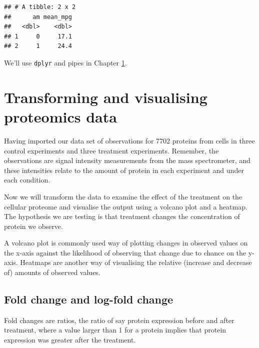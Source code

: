 \documentclass[12pt,]{book}
\newenvironment{Shaded}{\begin{snugshade}}{\end{snugshade}}
\newcommand{\KeywordTok}[1]{\textcolor[rgb]{0.13,0.29,0.53}{\textbf{#1}}}
\newcommand{\DataTypeTok}[1]{\textcolor[rgb]{0.13,0.29,0.53}{#1}}
\newcommand{\StringTok}[1]{\textcolor[rgb]{0.31,0.60,0.02}{#1}}
\newcommand{\CommentTok}[1]{\textcolor[rgb]{0.56,0.35,0.01}{\textit{#1}}}
\newcommand{\OperatorTok}[1]{\textcolor[rgb]{0.81,0.36,0.00}{\textbf{#1}}}
\newcommand{\NormalTok}[1]{#1}
\theoremstyle{definition}
\theoremstyle{definition}
\theoremstyle{definition}
\theoremstyle{remark}
\begin{document}
\begin{Shaded}
\end{Shaded}

\begin{verbatim}
## # A tibble: 2 x 2
##      am mean_mpg
##   <dbl>    <dbl>
## 1     0     17.1
## 2     1     24.4
\end{verbatim}

We'll use \texttt{dplyr} and pipes in Chapter \ref{transform}.

\chapter{Transforming and visualising proteomics data}\label{transform}

Having imported our data set of observations for 7702 proteins from
cells in three control experiments and three treatment experiments.
Remember, the observations are signal intensity measurements from the
mass spectrometer, and these intensities relate to the amount of protein
in each experiment and under each condition.

Now we will transform the data to examine the effect of the treatment on
the cellular proteome and visualise the output using a volcano plot and
a heatmap. The hypothesis we are testing is that treatment changes the
concentration of protein we observe.

A volcano plot is commonly used way of plotting changes in observed
values on the x-axis against the likelihood of observing that change due
to chance on the y-axis. Heatmaps are another way of visualising the
relative (increase and decrease of) amounts of observed values.

\section{Fold change and log-fold
change}\label{fold-change-and-log-fold-change}

Fold changes are ratios, the ratio of say protein expression before and
after treatment, where a value larger than 1 for a protein implies that
protein expression was greater after the treatment.
\end{document}
